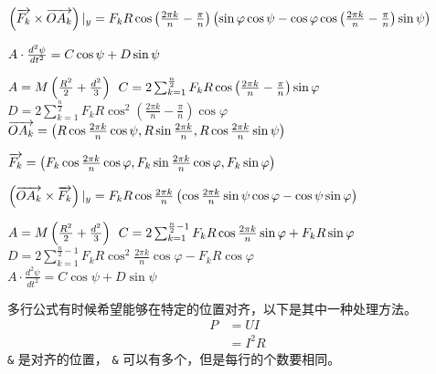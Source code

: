 \documentclass[withoutpreface,bwprint]{cumcmthesis} %
\begin{document}
$\left ( \overrightarrow{F_k} \times \overrightarrow{OA_k}\right )|_y=F_kR\cos\left( \frac{2\pi k}{n}-\frac{\pi}{n}\right )\left ( \sin\varphi\cos\psi-\cos\varphi\cos\left( \frac{2\pi k}{n}-\frac{\pi}{n}\right )\sin\psi \right )\\$

$A\cdot \frac{d^{2}\psi }{dt^{2} }=C\cos\psi+D\sin\psi   \\$

$A=M\left ( \frac{R^2}{2}+\frac{d^2}{3} \right ) \\$
$C=2\sum_{k=1}^{\frac{n}{2}}F_kR\cos\left( \frac{2\pi k}{n}-\frac{\pi}{n}\right )\sin\varphi \\ $
$D=2\sum_{k=1}^{\frac{n}{2}}F_kR\cos^2\left( \frac{2\pi k}{n}-\frac{\pi}{n}\right )\cos\varphi$
\\



$
\overrightarrow{OA_k}=\left ( R\cos\frac{2\pi k}{n}\cos \psi ,R\sin\frac{2\pi k}{n},R \cos\frac{2\pi k}{n}\sin\psi \right ) \\$

$\overrightarrow{F_k}=\left ( F_k\cos\frac{2\pi k}{n}\cos\varphi ,F_k\sin\frac{2\pi k}{n}\cos\varphi ,F_k\sin\varphi  \right ) \\$

$\left ( \overrightarrow{OA_k} \times \overrightarrow{F_k}\right )|_y=F_kR\cos\frac{2\pi k}{n}\left ( \cos\frac{2\pi k}{n}\sin\psi\cos\varphi -\cos\psi\sin\varphi  \right ) \\$

$A=M\left ( \frac{R^2}{2}+\frac{d^2}{3} \right ) \\$
$C=2\sum_{k=1}^{\frac{n}{2}-1}F_kR\cos\frac{2\pi k}{n}\sin\varphi+F_kR\sin\varphi \\ $
$D=2\sum_{k=1}^{\frac{n}{2}-1}F_kR\cos^2\frac{2\pi k}{n}\cos\varphi-F_k R\cos\varphi $
\\
$A\cdot \frac{d^{2}\psi }{dt^{2} }=C\cos\psi+D\sin\psi
$
















多行公式有时候希望能够在特定的位置对齐，以下是其中一种处理方法。
\begin{align}
P & = UI \\
& = I^2R
\end{align}
\verb|&| 是对齐的位置， \verb|&| 可以有多个，但是每行的个数要相同。
\end{document}
